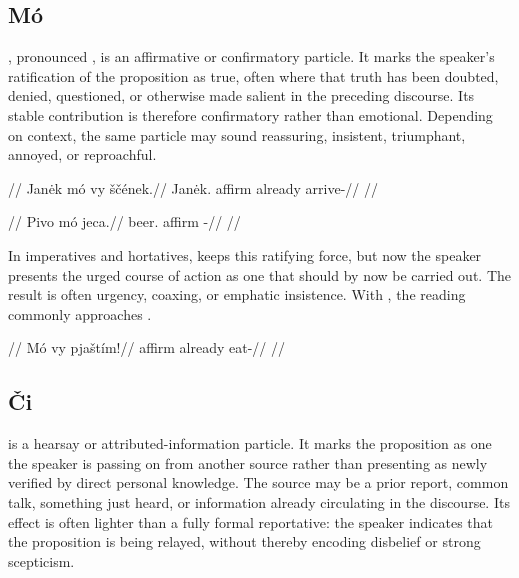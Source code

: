 \subsection{Mó} , pronounced \ipagloss{[ˈmoː]}, is an affirmative
or confirmatory particle. It marks
the speaker's ratification of the proposition as true, often where that truth
has been doubted, denied, questioned, or otherwise made salient in the
preceding discourse. Its stable contribution is therefore confirmatory rather
than emotional. Depending on context, the same particle may sound reassuring,
insistent, triumphant, annoyed, or reproachful.

\pex
\begingl
\glpreamble {}//
\gla Janėk mó vy ščének.//
\glb Janėk.\Dir{} affirm already arrive-\Pf{}//
\glft {}//
\endgl
\xe

\pex\label{ex:mo-reassurance}
\begingl
\glpreamble {}//
\gla Pivo mó jeca.//
\glb beer.\Dir{} affirm \Exst{}-\Cont{}//
\glft {}//
\endgl
\xe

In imperatives and hortatives,  keeps this ratifying force, but now
the speaker presents the urged course of action as one that should by now be
carried out. The result is often urgency, coaxing, or emphatic insistence.
With , the reading commonly approaches .

\pex
\begingl
\glpreamble {}//
\gla Mó vy pjaštím!//
\glb affirm already eat-\Imp{}//
\glft {}//
\endgl
\xe

\subsection{Či}  is a hearsay or attributed-information particle. It
marks the proposition as one the speaker is passing on from another source
rather than presenting as newly verified by direct personal knowledge. The
source may be a prior report, common talk, something just heard, or information
already circulating in the discourse. Its effect is often lighter than a fully
formal reportative: the speaker indicates that the proposition is being relayed,
without thereby encoding disbelief or strong scepticism.

